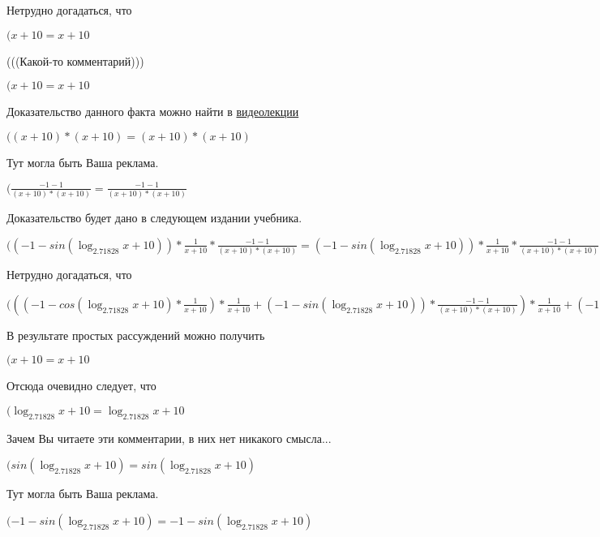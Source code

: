 \documentclass[12pt,a4paper,fleqn]{article}
\theoremstyle{definition}
\begin{document}
Нетрудно догадаться, что

$( x  +  10  =  x  +  10 $

(((Какой-то комментарий)))

$( x  +  10  =  x  +  10 $

Доказательство данного факта можно найти в \href{https://www.youtube.com/watch?v=dQw4w9WgXcQ}{видеолекции}

$(( x  +  10 ) * ( x  +  10 ) = ( x  +  10 ) * ( x  +  10 )$

Тут могла быть Ваша реклама.

$(\frac{ -1  -  1 }{( x  +  10 ) * ( x  +  10 )}
 = \frac{ -1  -  1 }{( x  +  10 ) * ( x  +  10 )}
$

Доказательство будет дано в следующем издании учебника.

$(( -1  - sin(\log_{ 2.71828 }{ x  +  10 })) * \frac{ 1 }{ x  +  10 }
 * \frac{ -1  -  1 }{( x  +  10 ) * ( x  +  10 )}
 = ( -1  - sin(\log_{ 2.71828 }{ x  +  10 })) * \frac{ 1 }{ x  +  10 }
 * \frac{ -1  -  1 }{( x  +  10 ) * ( x  +  10 )}
$

Нетрудно догадаться, что

$((( -1  - cos(\log_{ 2.71828 }{ x  +  10 }) * \frac{ 1 }{ x  +  10 }
) * \frac{ 1 }{ x  +  10 }
 + ( -1  - sin(\log_{ 2.71828 }{ x  +  10 })) * \frac{ -1  -  1 }{( x  +  10 ) * ( x  +  10 )}
) * \frac{ 1 }{ x  +  10 }
 + ( -1  - sin(\log_{ 2.71828 }{ x  +  10 })) * \frac{ 1 }{ x  +  10 }
 * \frac{ -1  -  1 }{( x  +  10 ) * ( x  +  10 )}
 = (( -1  - cos(\log_{ 2.71828 }{ x  +  10 }) * \frac{ 1 }{ x  +  10 }
) * \frac{ 1 }{ x  +  10 }
 + ( -1  - sin(\log_{ 2.71828 }{ x  +  10 })) * \frac{ -1  -  1 }{( x  +  10 ) * ( x  +  10 )}
) * \frac{ 1 }{ x  +  10 }
 + ( -1  - sin(\log_{ 2.71828 }{ x  +  10 })) * \frac{ 1 }{ x  +  10 }
 * \frac{ -1  -  1 }{( x  +  10 ) * ( x  +  10 )}
$

В результате простых рассуждений можно получить

$( x  +  10  =  x  +  10 $

Отсюда очевидно следует, что

$(\log_{ 2.71828 }{ x  +  10 } = \log_{ 2.71828 }{ x  +  10 }$

Зачем Вы читаете эти комментарии, в них нет никакого смысла...

$(sin(\log_{ 2.71828 }{ x  +  10 }) = sin(\log_{ 2.71828 }{ x  +  10 })$

Тут могла быть Ваша реклама.

$( -1  - sin(\log_{ 2.71828 }{ x  +  10 }) =  -1  - sin(\log_{ 2.71828 }{ x  +  10 })$
\end{document}
